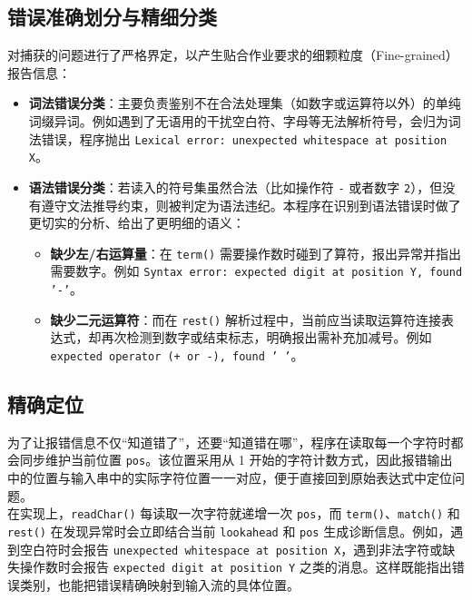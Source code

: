 \subsection{错误准确划分与精细分类}
对捕获的问题进行了严格界定，以产生贴合作业要求的细颗粒度（Fine-grained）报告信息：
\begin{itemize}
  \item \textbf{词法错误分类}：主要负责鉴别不在合法处理集（如数字或运算符以外）的单纯词缀异词。例如遇到了无语用的干扰空白符、字母等无法解析符号，会归为词法错误，程序抛出 \texttt{Lexical error: unexpected whitespace at position X}。
  \item \textbf{语法错误分类}：若读入的符号集虽然合法（比如操作符 \texttt{-} 或者数字 \texttt{2}），但没有遵守文法推导约束，则被判定为语法违纪。本程序在识别到语法错误时做了更切实的分析、给出了更明细的语义：
  \begin{itemize}
    \item \textbf{缺少左/右运算量}：在 \texttt{term()} 需要操作数时碰到了算符，报出异常并指出需要数字。例如 \texttt{Syntax error: expected digit at position Y, found '-'}。
    \item \textbf{缺少二元运算符}：而在 \texttt{rest()} 解析过程中，当前应当读取运算符连接表达式，却再次检测到数字或结束标志，明确报出需补充加减号。例如 \texttt{expected operator (+ or -), found ' '}。
  \end{itemize}
\end{itemize}

\subsection{精确定位}
为了让报错信息不仅“知道错了”，还要“知道错在哪”，程序在读取每一个字符时都会同步维护当前位置 \texttt{pos}。该位置采用从 1 开始的字符计数方式，因此报错输出中的位置与输入串中的实际字符位置一一对应，便于直接回到原始表达式中定位问题。\\
在实现上，\texttt{readChar()} 每读取一次字符就递增一次 \texttt{pos}，而 \texttt{term()}、\texttt{match()} 和 \texttt{rest()} 在发现异常时会立即结合当前 \texttt{lookahead} 和 \texttt{pos} 生成诊断信息。例如，遇到空白符时会报告 \texttt{unexpected whitespace at position X}，遇到非法字符或缺失操作数时会报告 \texttt{expected digit at position Y} 之类的消息。这样既能指出错误类别，也能把错误精确映射到输入流的具体位置。

